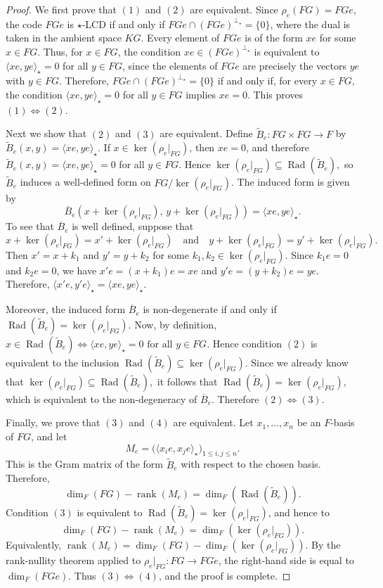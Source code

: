 \documentclass[11pt]{article}
\begin{document}
\begin{proof}
We first prove that $(1)$ and $(2)$ are equivalent. Since $\rho_e(FG)=FGe$, the code $FGe$ is $\star$-LCD if and only if $FGe\cap (FGe)^{\perp_\star}=\{0\}$, where the dual is taken in the ambient space $KG$. Every element of $FGe$ is of the form $xe$ for some $x\in FG$. Thus, for $x\in FG$, the condition $xe\in (FGe)^{\perp_\star}$ is equivalent to $\langle xe,ye\rangle_\star=0$ for all $y\in FG$, since the elements of $FGe$ are precisely the vectors $ye$ with $y\in FG$. Therefore, $FGe\cap (FGe)^{\perp_\star}=\{0\}$ if and only if, for every $x\in FG$, the condition $\langle xe,ye\rangle_\star=0$ for all $y\in FG$ implies $xe=0$. This proves $(1)\iff(2)$.

Next we show that $(2)$ and $(3)$ are equivalent. Define $\widetilde{B}_e:FG\times FG\longrightarrow F$ by
$
\widetilde{B}_e(x,y)=\langle xe,ye\rangle_\star.
$
If $x\in\ker(\rho_e|_{FG})$, then $xe=0$, and therefore
$
\widetilde{B}_e(x,y)=\langle xe,ye\rangle_\star=0
$
for all $y\in FG$. Hence
$
\ker(\rho_e|_{FG})\subseteq \operatorname{Rad}(\widetilde{B}_e),
$
so $\widetilde{B}_e$ induces a well-defined form on $FG/\ker(\rho_e|_{FG})$. The induced form is given by
$$
\overline{B}_e(x+\ker(\rho_e|_{FG}),\,y+\ker(\rho_e|_{FG}))=\langle xe,ye\rangle_\star.
$$
To see that $\overline{B}_e$ is well defined, suppose that
$$
x+\ker(\rho_e|_{FG})=x'+\ker(\rho_e|_{FG})
\quad\text{and}\quad
y+\ker(\rho_e|_{FG})=y'+\ker(\rho_e|_{FG}).
$$
Then $x'=x+k_1$ and $y'=y+k_2$ for some $k_1,k_2\in\ker(\rho_e|_{FG})$. Since $k_1e=0$ and $k_2e=0$, we have $x'e=(x+k_1)e=xe$ and $y'e=(y+k_2)e=ye$. Therefore,
$
\langle x'e,y'e\rangle_\star=\langle xe,ye\rangle_\star.
$

Moreover, the induced form $\overline{B}_e$ is non-degenerate if and only if
$
\operatorname{Rad}(\widetilde{B}_e)=\ker(\rho_e|_{FG}).
$
Now, by definition,
$
x\in \operatorname{Rad}(\widetilde{B}_e)
\iff
\langle xe,ye\rangle_\star=0 \text{ for all } y\in FG.
$
Hence condition $(2)$ is equivalent to the inclusion
$
\operatorname{Rad}(\widetilde{B}_e)\subseteq \ker(\rho_e|_{FG}).
$
Since we already know that
$
\ker(\rho_e|_{FG})\subseteq \operatorname{Rad}(\widetilde{B}_e),
$
it follows that
$
\operatorname{Rad}(\widetilde{B}_e)=\ker(\rho_e|_{FG}),
$
which is equivalent to the non-degeneracy of $\overline{B}_e$. Therefore $(2)\iff(3)$.


Finally, we prove that $(3)$ and $(4)$ are equivalent. Let $x_1,\dots,x_n$ be an $F$-basis of $FG$, and let
$$
M_e=\bigl(\langle x_i e,x_j e\rangle_\star\bigr)_{1\le i,j\le n}.
$$
This is the Gram matrix of the form $\widetilde{B}_e$ with respect to the chosen basis. Therefore,
$$
\dim_F(FG)-\operatorname{rank}(M_e)=\dim_F(\operatorname{Rad}(\widetilde{B}_e)).
$$
Condition $(3)$ is equivalent to $\operatorname{Rad}(\widetilde{B}_e)=\ker(\rho_e|_{FG})$, and hence to
$$
\dim_F(FG)-\operatorname{rank}(M_e)=\dim_F(\ker(\rho_e|_{FG})).
$$
Equivalently,
$
\operatorname{rank}(M_e)=\dim_F(FG)-\dim_F(\ker(\rho_e|_{FG})).
$
By the rank-nullity theorem applied to $\rho_e|_{FG}:FG\longrightarrow FGe$, the right-hand side is equal to $\dim_F(FGe)$. Thus $(3)\iff(4)$, and the proof is complete.
\end{proof}
\end{document}
